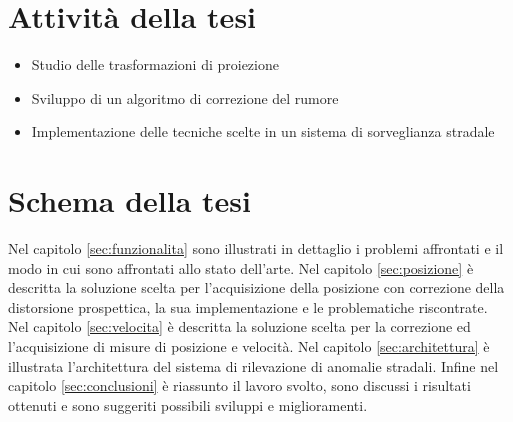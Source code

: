 \section{Attività della tesi}

\begin{itemize}
	\item Studio delle trasformazioni di proiezione
	\item Sviluppo di un algoritmo di correzione del rumore
	\item Implementazione delle tecniche scelte in un sistema di sorveglianza stradale
\end{itemize}

\section{Schema della tesi}

Nel capitolo \ref{sec:funzionalita} sono illustrati in dettaglio i problemi affrontati e il modo in cui sono affrontati allo stato dell'arte.
Nel capitolo \ref{sec:posizione} è descritta la soluzione scelta per l'acquisizione della posizione con correzione della distorsione prospettica, la sua implementazione e le problematiche riscontrate.
Nel capitolo \ref{sec:velocita} è descritta la soluzione scelta per la correzione ed l'acquisizione di misure di posizione e velocità.
Nel capitolo \ref{sec:architettura} è illustrata l'architettura del sistema di rilevazione di anomalie stradali.
Infine nel capitolo \ref{sec:conclusioni} è riassunto il lavoro svolto, sono discussi i risultati ottenuti e sono suggeriti possibili sviluppi e miglioramenti.
